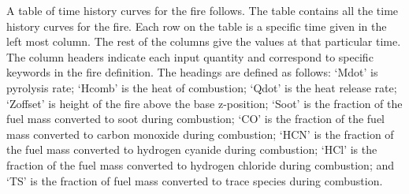 A table of time history curves for the fire follows.  The table contains all the time history curves for the fire.  Each row on the table is a specific time given in the left most column.  The rest of the columns give the values at that particular time.  The column headers indicate each input quantity and correspond to specific keywords in the fire definition. The headings are defined as follows: `Mdot' is pyrolysis rate; `Hcomb' is the heat of combustion; `Qdot' is the heat release rate; `Zoffset' is height of the fire above the base z-position; `Soot' is the fraction of the fuel mass converted to soot during combustion; `CO' is the fraction of the fuel mass converted to carbon monoxide during combustion; `HCN' is the fraction of the fuel mass converted to hydrogen cyanide during combustion; `HCl' is the fraction of the fuel mass converted to hydrogen chloride during combustion; and `TS' is the fraction of fuel mass converted to trace species during combustion.

